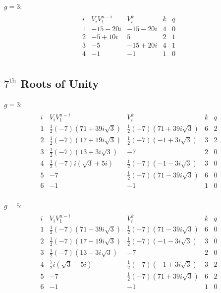 \documentclass{article}
\renewcommand\({\left(}
\renewcommand\){\right)}
\begin{document}
$g=3$:
\begin{align*}
    \begin{array}{c|c|c|c|c|c}
        i&V_iV_1^{n-i}&V_i^k&k&q\\
        \hline
        1 & -15-20 i & -15-20 i & 4 & 0 \\
        2 & -5+10 i & 5 & 2 & 1 \\
        3 & -5 & -15+20 i & 4 & 1 \\
        4 & -1 & -1 & 1 & 0 \\
    \end{array}
\end{align*}

\newpage
\subsection{$7^\text{th}$ Roots of Unity}
\vspace{6mm}
$g=3$:
\begin{align*}
    \begin{array}{c|c|c|c|c|c}
        i&V_iV_1^{n-i}&V_i^k&k&q\\
        \hline
        1 & \frac{1}{2} (-7) \left(71+39 i \sqrt{3}\right) & \frac{1}{2} (-7) \left(71+39 i \sqrt{3}\right) & 6 & 2 \\
        2 & \frac{1}{2} (-7) \left(17+19 i \sqrt{3}\right) & \frac{1}{2} (-7) \left(-1+3 i \sqrt{3}\right) & 3 & 2 \\
        3 & \frac{1}{2} (-7) \left(13+3 i \sqrt{3}\right) & -7 & 2 & 0 \\
        4 & \frac{1}{2} (-7) i \left(\sqrt{3}+5 i\right) & \frac{1}{2} (-7) \left(-1-3 i \sqrt{3}\right) & 3 & 0 \\
        5 & -7 & \frac{1}{2} (-7) \left(71-39 i \sqrt{3}\right) & 6 & 0 \\
        6 & -1 & -1 & 1 & 0 \\
    \end{array}
\end{align*}


$g=5$:
\begin{align*}
    \begin{array}{c|c|c|c|c|c}
        i&V_iV_1^{n-i}&V_i^k&k&q\\
        \hline
        1 & \frac{1}{2} (-7) \left(71-39 i \sqrt{3}\right) & \frac{1}{2} (-7) \left(71-39 i \sqrt{3}\right) & 6 & 0 \\
        2 & \frac{1}{2} (-7) \left(17-19 i \sqrt{3}\right) & \frac{1}{2} (-7) \left(-1-3 i \sqrt{3}\right) & 3 & 0 \\
        3 & \frac{1}{2} (-7) \left(13-3 i \sqrt{3}\right) & -7 & 2 & 0 \\
        4 & \frac{7}{2} i \left(\sqrt{3}-5 i\right) & \frac{1}{2} (-7) \left(-1+3 i \sqrt{3}\right) & 3 & 2 \\
        5 & -7 & \frac{1}{2} (-7) \left(71+39 i \sqrt{3}\right) & 6 & 2 \\
        6 & -1 & -1 & 1 & 0 \\
    \end{array}
\end{align*}
\end{document}
